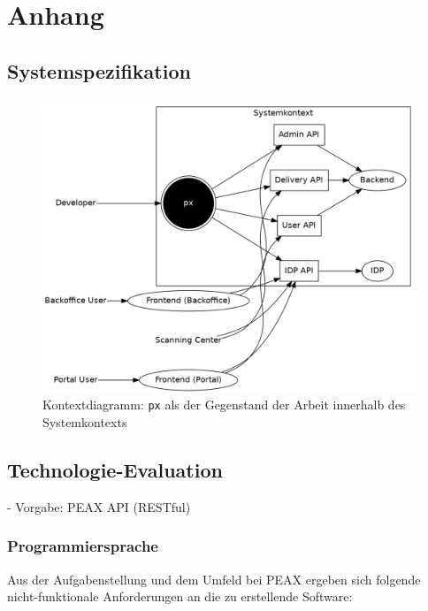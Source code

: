 \section{Anhang}

\subsection{Systemspezifikation}

\begin{figure}
	\centering
	\includegraphics[width=\linewidth]{pics/kontextdiagramm.png}
	\caption{Kontextdiagramm: \texttt{px} als der Gegenstand der Arbeit innerhalb des Systemkontexts}
	\label{fig:kontextdiagramm}
\end{figure}

\subsection{Technologie-Evaluation}

- Vorgabe: PEAX API (RESTful)

\subsubsection{Programmiersprache}

Aus der Aufgabenstellung und dem Umfeld bei PEAX ergeben sich folgende nicht-funktionale Anforderungen an die zu erstellende Software:

